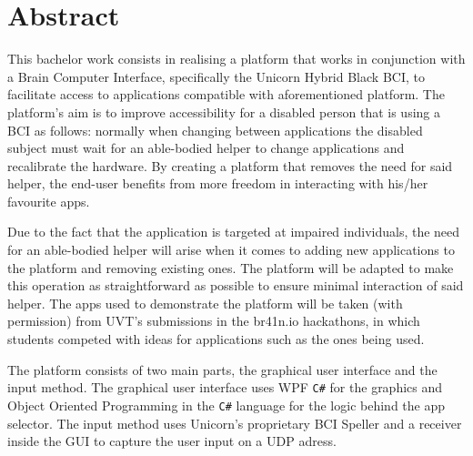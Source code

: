 \chapter*{Abstract}\label{cap:abstract_en}

\hspace{\parindent} This bachelor work consists in realising a platform that works in conjunction with a Brain Computer Interface, specifically the Unicorn Hybrid Black BCI\cite{Unicorn_Technology}, to facilitate access to applications compatible with aforementioned platform. The platform's aim is to improve accessibility for a disabled person that is using a BCI as follows: normally when changing between applications the disabled subject must wait for an able-bodied helper to change applications and recalibrate the hardware. By creating a platform that removes the need for said helper, the end-user benefits from more freedom in interacting with his/her favourite apps. 

\vspace*{2mm}
\hspace{\parindent} Due to the fact that the application is targeted at impaired individuals, the need for an able-bodied helper will arise when it comes to adding new applications to the platform and removing existing ones. The platform will be adapted to make this operation as straightforward as possible to ensure minimal interaction of said helper. The apps used to demonstrate the platform will be taken (with permission) from UVT's submissions in the br41n.io hackathons, in which students competed with ideas for applications such as the ones being used.

\vspace*{2mm}
\hspace{\parindent} The platform consists of two main parts, the graphical user interface and the input method. The graphical user interface uses WPF \texttt{C\#} for the graphics and Object Oriented Programming in the \texttt{C\#} language for the logic behind the app selector. The input method uses Unicorn's proprietary BCI Speller\cite{Unicorn_Speller} and a receiver inside the GUI to capture the user input on a UDP adress.



